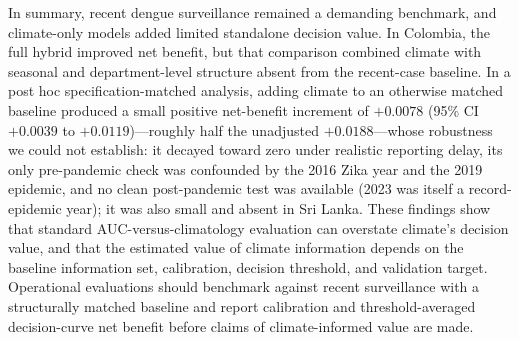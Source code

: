 \documentclass[11pt,a4paper]{article}
\begin{document}
In summary, recent dengue surveillance remained a demanding benchmark, and climate-only models added limited standalone decision value. In Colombia, the full hybrid improved net benefit, but that comparison combined climate with seasonal and department-level structure absent from the recent-case baseline. In a post hoc specification-matched analysis, adding climate to an otherwise matched baseline produced a small positive net-benefit increment of $+0.0078$ (95\% CI $+0.0039$ to $+0.0119$)---roughly half the unadjusted $+0.0188$---whose robustness we could not establish: it decayed toward zero under realistic reporting delay, its only pre-pandemic check was confounded by the 2016 Zika year and the 2019 epidemic, and no clean post-pandemic test was available (2023 was itself a record-epidemic year); it was also small and absent in Sri Lanka. These findings show that standard AUC-versus-climatology evaluation can overstate climate's decision value, and that the estimated value of climate information depends on the baseline information set, calibration, decision threshold, and validation target. Operational evaluations should benchmark against recent surveillance with a structurally matched baseline and report calibration and threshold-averaged decision-curve net benefit before claims of climate-informed value are made.

\end{document}
